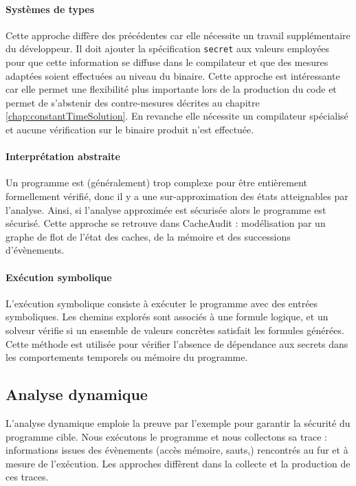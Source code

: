 \paragraph{Systèmes de types} Cette approche diffère des précédentes car elle nécessite un travail supplémentaire du développeur. Il doit ajouter la spécification \texttt{secret} aux valeurs employées pour que cette information se diffuse dans le compilateur et que des mesures adaptées soient effectuées au niveau du binaire. Cette approche est intéressante car elle permet une flexibilité plus importante lors de la production du code et permet de s'abstenir des contre-mesures décrites au chapitre \ref{chap:constantTimeSolution}. En revanche elle nécessite un compilateur spécialisé et aucune vérification sur le binaire produit n'est effectuée. 

\paragraph{Interprétation abstraite} Un programme est (généralement) trop complexe pour être entièrement formellement vérifié, donc il y a une sur-approximation des états atteignables par l'analyse. Ainsi, si l'analyse approximée est sécurisée alors le programme est sécurisé. Cette approche se retrouve dans CacheAudit \cite{CacheAudit} : modélisation par un graphe de flot de l'état des caches, de la mémoire et des successions d'évènements.

\paragraph{Exécution symbolique} L'exécution symbolique consiste à exécuter le programme avec des entrées symboliques. Les chemins explorés sont associés à une formule logique, et un solveur vérifie si un ensemble de valeurs concrètes satisfait les formules générées. Cette méthode est utilisée pour vérifier l'absence de dépendance aux secrets dans les comportements temporels ou mémoire du programme.

\subsection*{Analyse dynamique}

L'analyse dynamique emploie la preuve par l'exemple pour garantir la sécurité du programme cible. Nous exécutons le programme et nous collectons sa trace : informations issues des évènements (accès mémoire, sauts,\etc) rencontrés au fur et à mesure de l'exécution. Les approches diffèrent dans la collecte et la production de ces traces.

